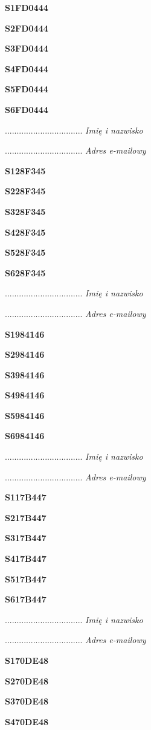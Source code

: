 \Large \textbf{S1FD0444}

\Large \textbf{S2FD0444}

\Large \textbf{S3FD0444}

\Large \textbf{S4FD0444}

\Large \textbf{S5FD0444}

\Large \textbf{S6FD0444}

.................................
\textit{Imię i nazwisko}

.................................
\textit{Adres e-mailowy}

\Large \textbf{S128F345}

\Large \textbf{S228F345}

\Large \textbf{S328F345}

\Large \textbf{S428F345}

\Large \textbf{S528F345}

\Large \textbf{S628F345}

.................................
\textit{Imię i nazwisko}

.................................
\textit{Adres e-mailowy}

\Large \textbf{S1984146}

\Large \textbf{S2984146}

\Large \textbf{S3984146}

\Large \textbf{S4984146}

\Large \textbf{S5984146}

\Large \textbf{S6984146}

.................................
\textit{Imię i nazwisko}

.................................
\textit{Adres e-mailowy}

\Large \textbf{S117B447}

\Large \textbf{S217B447}

\Large \textbf{S317B447}

\Large \textbf{S417B447}

\Large \textbf{S517B447}

\Large \textbf{S617B447}

.................................
\textit{Imię i nazwisko}

.................................
\textit{Adres e-mailowy}

\Large \textbf{S170DE48}

\Large \textbf{S270DE48}

\Large \textbf{S370DE48}

\Large \textbf{S470DE48}

